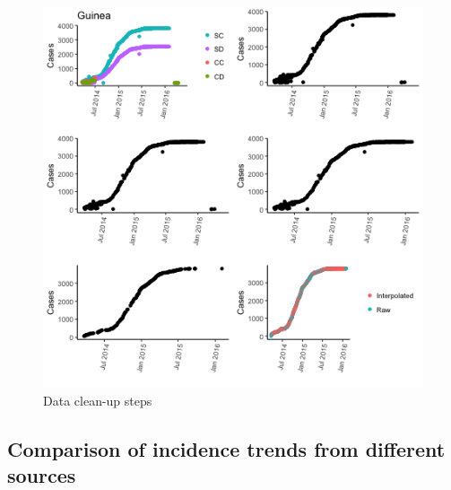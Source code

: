 \documentclass[]{article}
\begin{document}
\begin{figure}

{\centering \includegraphics[width=6.67in]{figures/guinea} 

}

\caption{Data clean-up steps}\label{fig:hmclean}
\end{figure}

\subsection{Comparison of incidence trends from different
sources}\label{comparison-of-incidence-trends-from-different-sources}


\end{document}
